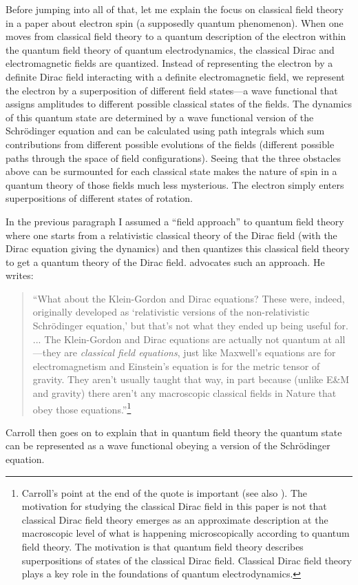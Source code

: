 \documentclass[12pt,secnumarabic,amsmath,amssymb,balancelastpage,nofootinbib]{article}
\begin{document}
Before jumping into all of that, let me explain the focus on classical field theory in a paper about electron spin (a supposedly quantum phenomenon).  When one moves from classical field theory to a quantum description of the electron within the quantum field theory of quantum electrodynamics, the classical Dirac and electromagnetic fields are quantized.  Instead of representing the electron by a definite Dirac field interacting with a definite electromagnetic field, we represent the electron by a superposition of different field states---a wave functional that assigns amplitudes to different possible classical states of the fields.  The dynamics of this quantum state are determined by a wave functional version of the Schr\"{o}dinger equation and can be calculated using path integrals which sum contributions from different possible evolutions of the fields (different possible paths through the space of field configurations).  Seeing that the three obstacles above can be surmounted for each classical state makes the nature of spin in a quantum theory of those fields much less mysterious.  The electron simply enters superpositions of different states of rotation.

In the previous paragraph I assumed a ``field approach'' to quantum field theory where one starts from a relativistic classical theory of the Dirac field (with the Dirac equation giving the dynamics) and then quantizes this classical field theory to get a quantum theory of the Dirac field.  \citet{carrollblog} advocates such an approach.  He writes:
\begin{quote}
``What about the Klein-Gordon and Dirac equations? These were, indeed, originally developed as `relativistic versions of the non-relativistic Schr\"{o}dinger equation,' but that's not what they ended up being useful for. ... The Klein-Gordon and Dirac equations are actually not quantum at all---they are \emph{classical field equations}, just like Maxwell's equations are for electromagnetism and Einstein's equation is for the metric tensor of gravity. They aren't usually taught that way, in part because (unlike E\&M and gravity) there aren't any macroscopic classical fields in Nature that obey those equations.''\footnote{Carroll's point at the end of the quote is important (see also \citealp[chapter 8]{duncan}).  The motivation for studying the classical Dirac field in this paper is not that classical Dirac field theory emerges as an approximate description at the macroscopic level of what is happening microscopically according to quantum field theory.  The motivation is that quantum field theory describes superpositions of states of the classical Dirac field.  Classical Dirac field theory plays a key role in the foundations of quantum electrodynamics.}
\end{quote}
Carroll then goes on to explain that in quantum field theory the quantum state can be represented as a wave functional obeying a version of the Schr\"{o}dinger equation.
\end{document}
